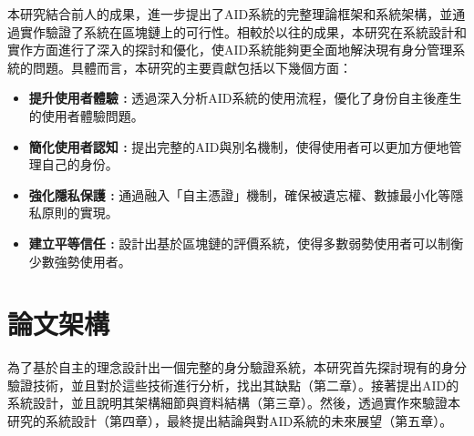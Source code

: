 本研究結合前人的成果，進一步提出了AID系統的完整理論框架和系統架構，並通過實作驗證了系統在區塊鏈上的可行性。相較於以往的成果，本研究在系統設計和實作方面進行了深入的探討和優化，使AID系統能夠更全面地解決現有身分管理系統的問題。具體而言，本研究的主要貢獻包括以下幾個方面：
\begin{itemize}
  \item \textbf{提升使用者體驗 :} 透過深入分析AID系統的使用流程，優化了身份自主後產生的使用者體驗問題。
  \item \textbf{簡化使用者認知 :} 提出完整的AID與別名機制，使得使用者可以更加方便地管理自己的身份。
  \item \textbf{強化隱私保護 :} 通過融入「自主憑證」機制，確保被遺忘權、數據最小化等隱私原則的實現。
  \item \textbf{建立平等信任 :} 設計出基於區塊鏈的評價系統，使得多數弱勢使用者可以制衡少數強勢使用者。
\end{itemize}
\section{論文架構}
為了基於自主的理念設計出一個完整的身分驗證系統，本研究首先探討現有的身分驗證技術，並且對於這些技術進行分析，找出其缺點（第二章）。接著提出AID的系統設計，並且說明其架構細節與資料結構（第三章）。然後，透過實作來驗證本研究的系統設計（第四章），最終提出結論與對AID系統的未來展望（第五章）。